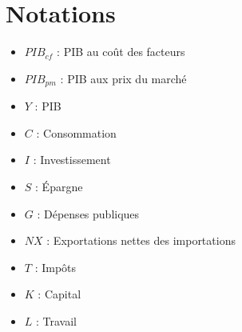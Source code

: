 \documentclass[10pt]{book}
\begin{document}
\chapter{Notations} 
\begin{itemize}
  \item $PIB_{cf}$ : PIB au coût des facteurs
  \item $PIB_{pm}$ : PIB aux prix du marché
  \item $Y$ : PIB
  \item $C$ : Consommation
  \item $I$ : Investissement
  \item $S$ : Épargne
  \item $G$ : Dépenses publiques
  \item $NX$ : Exportations nettes des importations
  \item $T$ : Impôts
  \item $K$ : Capital
  \item $L$ : Travail
\end{itemize}
\end{document}
